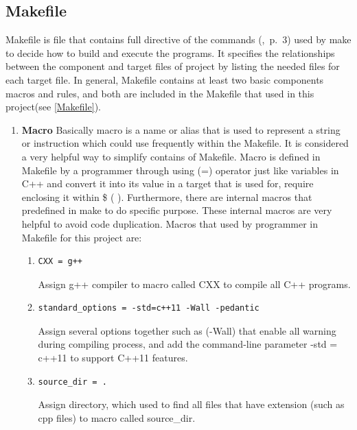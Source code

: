 \documentclass[11pt]{report}
\begin{document}
\subsection{Makefile}
\label{subsec: makefile}
Makefile is file that contains full directive of the commands (\cite{Mecklenburg:2004:MakeGun},~p.~3) used by make to decide how to build and execute the programs. It specifies the relationships between the component and target files of project by listing the needed files for each target file. In general, Makefile contains at least two basic components macros and rules, and both are included in the Makefile that used in this project(see \ref{Makefile}).

\begin{enumerate}
\item \textbf{Macro} Basically macro is a name or alias that is used to represent a string or instruction which could use frequently within the Makefile.  It is considered a very helpful way to simplify contains of Makefile. Macro is defined in Makefile by a programmer through using (=) operator just like variables in C++ and convert it into its value in a target that is used for, require enclosing it within \$ ( ). Furthermore, there are internal macros that predefined in make to do specific purpose. These internal macros are very helpful to avoid code duplication. Macros that used by programmer in Makefile for this project are:

\begin{enumerate}


\item \begin{verbatim}
CXX = g++ 
\end{verbatim}
Assign g++ compiler to macro called CXX to compile all C++ programs.


\item \begin{verbatim}
standard_options = -std=c++11 -Wall -pedantic
\end{verbatim}
Assign several options together such as (-Wall) that enable all warning during compiling process, and add the command-line parameter -std = c++11 to support C++11 features.

\item \begin{verbatim}
source_dir = .
\end{verbatim}
Assign directory, which used to find all files that have extension (such as cpp files)  to macro called source\_dir.


\end{enumerate}
\end{enumerate}
\end{document}
